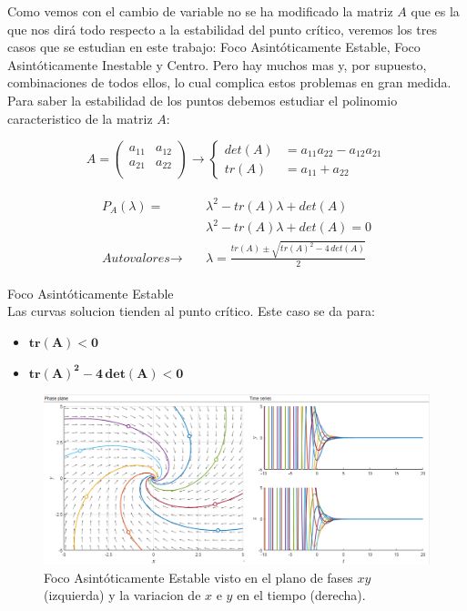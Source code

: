 \documentclass[12pt,a4paper]{report} %
\begin{document}
	Como vemos con el cambio de variable no se ha modificado la matriz $A$ que es la que nos dirá todo respecto a la estabilidad del punto crítico, veremos los tres casos que se estudian en este trabajo: Foco Asintóticamente Estable, Foco Asintóticamente Inestable y Centro. Pero hay muchos mas y, por supuesto, combinaciones de todos ellos, lo cual complica estos problemas en gran medida.\\[0.5cm]
	Para saber la estabilidad de los puntos debemos estudiar el polinomio caracteristico de la matriz $A$:
	
	\begin{equation}
		\label{eq:equilibrio}
		A=\begin{pmatrix}
			a_{11} & a_{12}\\
			a_{21} & a_{22}\\
		\end{pmatrix}\rightarrow\left\{
		\begin{aligned}
		det(A )&= a_{11}a_{22}-a_{12}a_{21} \\
		tr(A) &= a_{11}+a_{22}
	    \end{aligned}
		\right.
	\end{equation}\smallskip
	
	\begin{eqnarray}
		\begin{aligned}
		P_A(\lambda)=&\lambda^2-tr(A)\lambda+det(A) \nonumber \\[1mm]
		&\lambda^2-tr(A)\lambda+det(A)=0 \nonumber \\[1mm]
		\textit{Autovalores}\rightarrow \quad &\lambda=\frac{tr(A)\pm \sqrt{tr(A)^2-4\,det(A)}}{2}
	    \end{aligned}
	\end{eqnarray}
	
	\newpage

	{\Large\textbullet\quad Foco Asintóticamente Estable}\\[0.5cm]
	
	Las curvas solucion tienden al punto crítico. Este caso se da para: 
	\begin{itemize}
		\item $\bm{tr(A)<0}$
		\item $\bm{tr(A)^2-4\,det(A)<0}$
	\end{itemize}
	
	\begin{figure}[h]
		\centering
		\includegraphics[width=1\textwidth]{estable.png}
		\caption{Foco Asintóticamente Estable visto en el plano de fases $xy$ (izquierda) y la variacion de $x$ e $y$ en el tiempo (derecha).}
		\label{fig:estable}
	\end{figure}\smallskip
	
\end{document}
